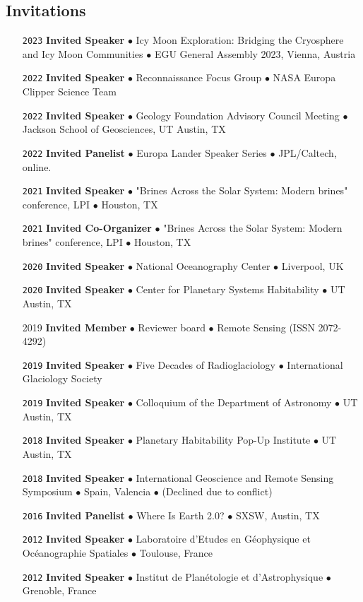 \vspace{-1.5em}
\subsection*{Invitations}

\begin{itemize}[leftmargin=3.8em, labelsep=1.5em]
    \setlength\itemsep{-.5em}
    \item[\texttt{2023}] \textbf{Invited Speaker} $\bullet$ Icy Moon Exploration: Bridging the Cryosphere and Icy Moon Communities $\bullet$  EGU General Assembly 2023, Vienna, Austria
    \item[\texttt{2022}] \textbf{Invited Speaker} $\bullet$ Reconnaissance Focus Group $\bullet$ NASA Europa Clipper Science Team
    \item[\texttt{2022}] \textbf{Invited Speaker} $\bullet$ Geology Foundation Advisory Council Meeting $\bullet$ Jackson School of Geosciences, UT Austin, TX
    \item[\texttt{2022}] \textbf{Invited Panelist} $\bullet$ Europa Lander Speaker Series $\bullet$ JPL/Caltech, online.
    \item[\texttt{2021}] \textbf{Invited Speaker} $\bullet$ "Brines Across the Solar System: Modern brines" conference, LPI $\bullet$ Houston, TX
    \item[\texttt{2021}] \textbf{Invited Co-Organizer} $\bullet$ "Brines Across the Solar System: Modern brines" conference, LPI $\bullet$ Houston, TX
    \item[\texttt{2020}] \textbf{Invited Speaker} $\bullet$ National Oceanography Center $\bullet$ Liverpool, UK
    \item[\texttt{2020}] \textbf{Invited Speaker} $\bullet$ Center for Planetary Systems Habitability $\bullet$ UT Austin, TX
    \item[2019] \textbf{Invited Member} $\bullet$ Reviewer board $\bullet$ Remote Sensing (ISSN 2072-4292)
    \item[\texttt{2019}] \textbf{Invited Speaker} $\bullet$ Five Decades of Radioglaciology $\bullet$ International Glaciology Society
    \item[\texttt{2019}] \textbf{Invited Speaker} $\bullet$ Colloquium of the Department of Astronomy $\bullet$ UT Austin, TX
    \item[\texttt{2018}] \textbf{Invited Speaker} $\bullet$ Planetary Habitability Pop-Up Institute $\bullet$ UT Austin, TX
    \item[\texttt{2018}] \textbf{Invited Speaker} $\bullet$ International Geoscience and Remote Sensing Symposium $\bullet$ Spain, Valencia $\bullet$ (Declined due to conflict)
    \item[\texttt{2016}] \textbf{Invited Panelist} $\bullet$ Where Is Earth 2.0? $\bullet$ SXSW, Austin, TX
    \item[\texttt{2012}] \textbf{Invited Speaker} $\bullet$ Laboratoire d'Etudes en Géophysique et Océanographie Spatiales $\bullet$ Toulouse, France
    \item[\texttt{2012}] \textbf{Invited Speaker} $\bullet$ Institut de Planétologie et d'Astrophysique $\bullet$ Grenoble, France
\end{itemize}